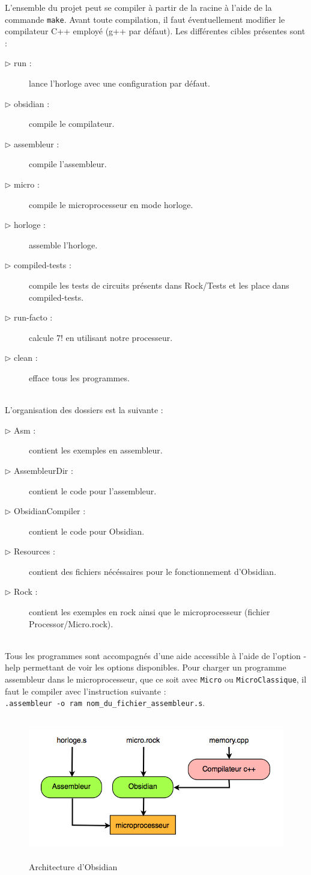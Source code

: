 \documentclass[13pt]{article}
\begin{document}
L'ensemble du projet peut se compiler à partir de la racine à l'aide de
la commande \texttt{make}. Avant toute compilation, il faut éventuellement modifier le compilateur
C++ employé (g++ par défaut). Les différentes cibles présentes sont :
\begin{description}
\item[$\rhd$ run :] lance l'horloge avec une configuration par défaut.
\item[$\rhd$ obsidian :] compile le compilateur.
\item[$\rhd$ assembleur :] compile l'assembleur.
\item[$\rhd$ micro :] compile le microprocesseur en mode \og horloge\fg{}.
\item[$\rhd$ horloge :] assemble l'horloge.
\item[$\rhd$ compiled-tests :] compile les tests de circuits présents dans Rock/Tests
  et les place dans compiled-tests.
\item[$\rhd$ run-facto :] calcule 7! en utilisant notre processeur.
\item[$\rhd$ clean :] efface tous les programmes.
\end{description}
\text{}\\
L'organisation des dossiers est la suivante :
\begin{description}
\item[$\rhd$ Asm :] contient les exemples en assembleur.
\item[$\rhd$ AssembleurDir :] contient le code pour l'assembleur.
\item[$\rhd$ ObsidianCompiler :] contient le code pour Obsidian.
\item[$\rhd$ Resources :] contient des fichiers nécéssaires pour le fonctionnement
  d'Obsidian.
\item[$\rhd$ Rock :] contient les exemples en rock ainsi que le microprocesseur
  (fichier Processor/Micro.rock).
\end{description}
\text{}\\
Tous les programmes sont accompagnés d'une aide accessible à l'aide de l'option
-help permettant de voir les options disponibles. Pour charger un programme
assembleur dans le microprocesseur, que ce soit avec \texttt{Micro} ou
\texttt{MicroClassique}, il faut le compiler avec l'instruction suivante : \\
\texttt{.assembleur -o ram nom\_du\_fichier\_assembleur.s}.

\begin{figure}[!h]
\centering
\includegraphics[width=13.5cm,height=6.2cm]{exec.png}
\caption{Architecture d'Obsidian}
\label{Architecture d'Obsidian}
\end{figure}
\end{document}
